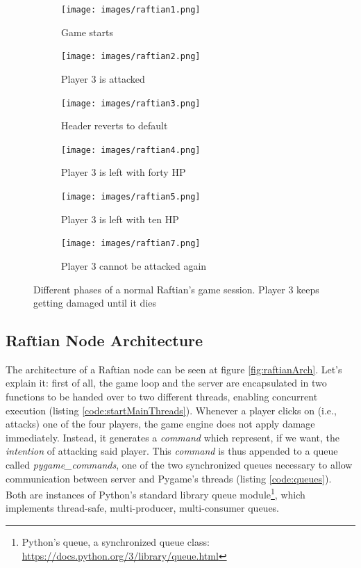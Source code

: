 \begin{figure}[h]
    \centering
    \begin{subfigure}{0.31\textwidth}
        \texttt{[image: images/raftian1.png]}
        \caption{Game starts}
    \end{subfigure}
    \hfill
    \begin{subfigure}{0.31\textwidth}
        \texttt{[image: images/raftian2.png]}
        \caption{Player 3 is attacked}
    \end{subfigure}
    \hfill
    \begin{subfigure}{0.31\textwidth}
        \texttt{[image: images/raftian3.png]}
        \caption{Header reverts to default}
    \end{subfigure}
    \hfill
    \begin{subfigure}{0.31\textwidth}
        \texttt{[image: images/raftian4.png]}
        \caption{Player 3 is left with forty HP}
    \end{subfigure}
    \hfill
    \begin{subfigure}{0.31\textwidth}
        \texttt{[image: images/raftian5.png]}
        \caption{Player 3 is left with ten HP}
    \end{subfigure}
    \hfill
    \begin{subfigure}{0.31\textwidth}
        \texttt{[image: images/raftian7.png]}
        \caption{Player 3 cannot be attacked again}
    \end{subfigure}

    \caption{Different phases of a normal Raftian's game session. Player 3 keeps getting damaged until it dies}
    \label{fig:raftianUI}
\end{figure}

\subsection{Raftian Node Architecture}

The architecture of a Raftian node can be seen at figure \ref{fig:raftianArch}. Let's explain it: first of all, the game loop and the server are encapsulated in two functions to be handed over to two different threads, enabling concurrent execution (listing \ref{code:startMainThreads}). Whenever a player clicks on (i.e., attacks) one of the four players, the game engine does not apply damage immediately. Instead, it generates a \textit{command} which represent, if we want, the \textit{intention} of attacking said player. This \textit{command} is thus appended to a queue called \textit{pygame\_commands}, one of the two synchronized queues necessary to allow communication between server and Pygame's threads (listing \ref{code:queues}). Both are instances of Python's standard library queue module\footnote{Python's queue, a synchronized queue class: \url{https://docs.python.org/3/library/queue.html}}, which implements thread-safe, multi-producer, multi-consumer queues. 

